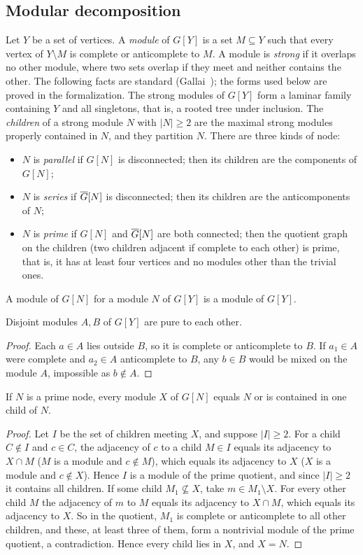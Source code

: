 \subsection{Modular decomposition}\label{sec:md}
Let $Y$ be a set of vertices. A \emph{module} of $G[Y]$ is a set $M\subseteq Y$ such that every vertex of
$Y\setminus M$ is complete or anticomplete to $M$. A module is \emph{strong} if it overlaps no other
module, where two sets overlap if they meet and neither contains the other. The following facts are
standard (Gallai~\cite{Gallai}); the forms used below are proved in the formalization. The strong modules
of $G[Y]$ form a laminar family containing $Y$ and all singletons, that is, a rooted tree under inclusion.
The \emph{children} of a strong module $N$ with $|N|\ge2$ are the maximal strong modules properly
contained in $N$, and they partition $N$. There are three kinds of node:
\begin{itemize}[leftmargin=1.5em]
\item $N$ is \emph{parallel} if $G[N]$ is disconnected; then its children are the components of $G[N]$;
\item $N$ is \emph{series} if $\overline{G}[N]$ is disconnected; then its children are the anticomponents of
  $N$;
\item $N$ is \emph{prime} if $G[N]$ and $\overline{G}[N]$ are both connected; then the quotient graph on the
  children (two children adjacent if complete to each other) is prime, that is, it has at least four
  vertices and no modules other than the trivial ones.
\end{itemize}
A module of $G[N]$ for a module $N$ of $G[Y]$ is a module of $G[Y]$.

\begin{lemma}[MD1]\label{lem:md1}
Disjoint modules $A,B$ of $G[Y]$ are pure to each other.
\end{lemma}
\begin{proof}
Each $a\in A$ lies outside $B$, so it is complete or anticomplete to $B$. If $a_1\in A$ were complete and
$a_2\in A$ anticomplete to $B$, any $b\in B$ would be mixed on the module $A$, impossible as $b\notin A$.
\end{proof}

\begin{lemma}[MD2]\label{lem:md2}
If $N$ is a prime node, every module $X$ of $G[N]$ equals $N$ or is contained in one child of $N$.
\end{lemma}
\begin{proof}
Let $I$ be the set of children meeting $X$, and suppose $|I|\ge2$. For a child $C\notin I$ and $c\in C$,
the adjacency of $c$ to a child $M\in I$ equals its adjacency to $X\cap M$ ($M$ is a module and
$c\notin M$), which equals its adjacency to $X$ ($X$ is a module and $c\notin X$). Hence $I$ is a module
of the prime quotient, and since $|I|\ge2$ it contains all children. If some child $M_1\not\subseteq X$,
take $m\in M_1\setminus X$. For every other child $M$ the adjacency of $m$ to $M$ equals its adjacency to
$X\cap M$, which equals its adjacency to $X$. So in the quotient, $M_1$ is complete or anticomplete to all
other children, and these, at least three of them, form a nontrivial module of the prime quotient, a
contradiction. Hence every child lies in $X$, and $X=N$.
\end{proof}
